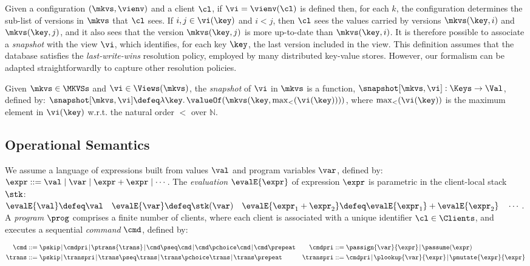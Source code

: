 Given a configuration \((\mkvs, \vienv)\) and a client \(\cl\), 
if \(\vi = \vienv(\cl)\) is defined then, for each \(k\),  the
configuration determines the sub-list of versions in \(\mkvs\) that \(\cl\) sees.
If \(i,j \in \vi(\key)\) and \(i < j\), then \(\cl\) sees the values 
carried by versions \(\mkvs(\key, i)\) and  \(\mkvs(\key, j)\), 
and it also sees that the version \(\mkvs(\key, j)\) is more up-to-date than \(\mkvs(\key, i)\). 
It is therefore possible to associate a \emph{snapshot} with the view \(\vi\), 
which identifies, for each key \(\key\), the last version included in the view. 
This definition assumes that the database satisfies the \emph{last-write-wins}
resolution policy, employed by many distributed key-value stores.
However, our formalism can be adapted straightforwardly  to capture other resolution policies. 

\SpaceAboveDef
\begin{definition}
\label{def:snapshot}
Given \(\mkvs \in \MKVSs\) and \(\vi \in \Views(\mkvs)\), the \emph{snapshot} of \(\vi\) in 
\(\mkvs\) is a function, 
\(\snapshot[\mkvs, \vi] : \Keys \to \Val\), 
defined by: \(\snapshot[\mkvs, \vi] \defeq \lambda \key \ldotp \valueOf(\mkvs(\key, \max_{<}(\vi(\key))))\), 
where \(\max_{<}(\vi(\key))\) is the maximum element in \(\vi(\key)\) w.r.t. the natural 
order \(<\) over \(\mathbb{N}\).
\end{definition}
\SpaceBelowDef

\subsection{Operational Semantics}
\label{subsec:kv-store-op}

We assume a language of expressions built from values \( \val \)
and program variables \( \var \), defined by:
\(\expr ::= \val \mid \var \mid \expr + \expr \mid \cdots\).
The \emph{evaluation} \(\evalE{\expr}\) of expression \(\expr\) is parametric in
the client-local stack \( \stk \):
\(
\evalE{\val} \defeq
\val
\quad
\evalE{\var} \defeq
\stk(\var)
\quad
\evalE{\expr_{1} + \expr_{2}} \defeq
\evalE{\expr_{1}} + \evalE{\expr_{2}}
\quad
\cdots
\).
A \emph{program} \( \prog \) comprises a finite number of clients,
where each client is associated with a unique identifier \( \cl \in \Clients \), 
and executes a sequential \emph{command} \(\cmd\), defined by:

\SpaceAboveMath
\[
\begin{aligned}
\cmd & ::=  
\pskip \!\mid\!
\cmdpri \!\mid\!  
\ptrans{\trans} \!\mid\! 
\cmd \pseq \cmd \!\mid\! 
\cmd \pchoice \cmd \!\mid\! 
\cmd \prepeat
&
 \cmdpri & ::=  
\passign{\var}{\expr} \!\mid\! 
\passume(\expr)
\\
\trans & ::=
\pskip \!\mid\!
\transpri \!\mid\! 
\trans \pseq \trans \!\mid\!
\trans \pchoice \trans \!\mid\!
\trans\prepeat    
&
\transpri & ::= 
\cmdpri \!\mid\!
\plookup{\var}{\expr} \!\mid\!
\pmutate{\expr}{\expr} 
\end{aligned}%
\]
\SpaceBelowMath
 
